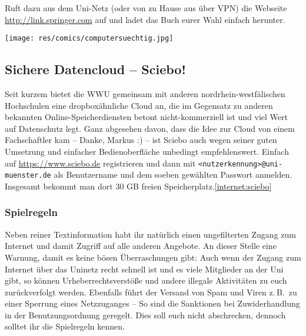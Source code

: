 \begin{multicols}{2}
Ruft dazu aus dem Uni-Netz (oder von zu Hause aus über VPN) die Webseite \url{http://link.springer.com} auf und ladet das Buch eurer Wahl einfach herunter.

\texttt{[image: res/comics/computersuechtig.jpg]}

\subsection*{Sichere Datencloud -- Sciebo!}
Seit kurzem bietet die WWU gemeinsam mit anderen nordrhein-westfälischen Hochschulen eine dropboxähnliche Cloud an, die im Gegensatz zu anderen bekannten Online-Speicherdiensten betont nicht-kommerziell ist und viel Wert auf Datenschutz legt. Ganz abgesehen davon, dass die Idee zur Cloud von einem Fachschaftler kam -- Danke, Markus :) -- ist Sciebo auch wegen seiner guten Umsetzung und einfacher Bedienoberfläche unbedingt empfehlenswert. Einfach auf \url{https://www.sciebo.de} registrieren und dann mit \texttt{<nutzerkennung>@uni-muenster.de} als Benutzername und dem soeben gewählten Passwort anmelden. Insgesamt bekommt man dort 30 GB freien Speicherplatz.\cref{internet:sciebo}

\subsubsection*{Spielregeln}
Neben reiner Textinformation habt ihr natürlich einen ungefilterten Zugang zum Internet und damit Zugriff auf alle anderen Angebote. An dieser Stelle eine Warnung, damit es keine bösen Überraschungen gibt: Auch wenn der Zugang zum Internet über das Uninetz recht schnell ist und es viele Mitglieder an der Uni gibt, so können Urheberrechtsverstöße und andere illegale Aktivitäten zu euch zurückverfolgt werden. Ebenfalls führt der Versand von Spam und Viren z.\,B.\ zu einer Sperrung eines Netzzuganges -- So sind die Sanktionen bei Zuwiderhandlung in der Benutzungsordnung geregelt. Dies soll euch nicht abschrecken, dennoch solltet ihr die Spielregeln kennen.


\end{multicols}
